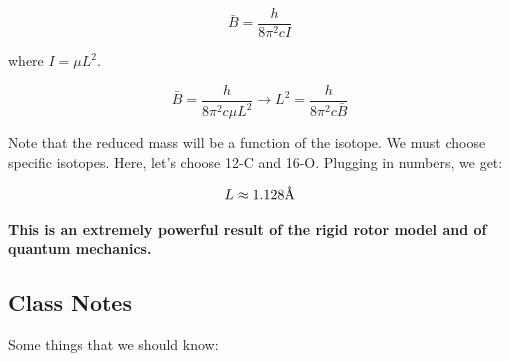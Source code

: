 \documentclass{article}
\newcommand{\angstrom}{\mbox{\normalfont\AA}}
\begin{document}
\begin{equation}
    \bar{B} = \frac{h}{8 \pi^2 c I}
\end{equation}

where $I = \mu L^2$.


\begin{equation}
    \bar{B} = \frac{h}{8 \pi^2 c \mu L^2} \rightarrow L^2 = \frac{h}{8 \pi^2 c \bar{B}}
\end{equation}

Note that the reduced mass will be a function of the isotope. We must choose specific isotopes. Here, let's choose 12-C and 16-O. Plugging in numbers, we get:

\begin{equation}
    L \approx 1.128 \angstrom
\end{equation}

\textbf{This is an extremely powerful result of the rigid rotor model and of quantum mechanics.}

\subsection{Class Notes}

Some things that we should know:
\end{document}
